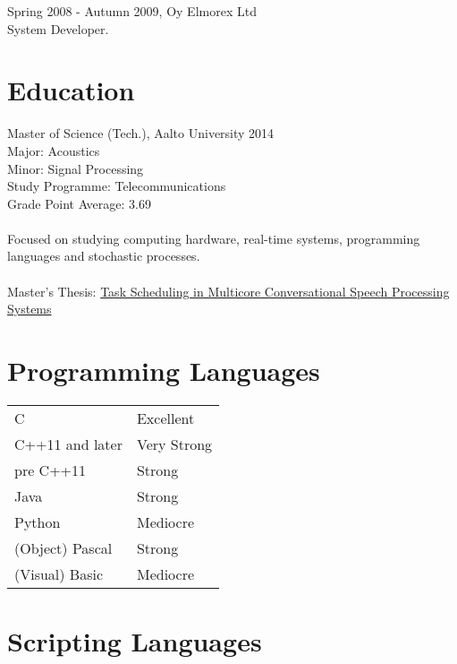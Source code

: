 \documentclass[12pt]{article}
\begin{document}
\large{Spring 2008 - Autumn 2009, Oy Elmorex Ltd}\\
\normalsize{System Developer.}\\


\section*{Education}

\large{Master of Science (Tech.), Aalto University 2014}\\
\normalsize{
Major: Acoustics\\
Minor: Signal Processing\\
Study Programme: Telecommunications\\
Grade Point Average: 3.69\\
\\
Focused on studying computing hardware, real-time systems, programming 
languages and stochastic processes.\\
\\
Master's Thesis:
\href{https://aaltodoc.aalto.fi/bitstream/handle/123456789/14402/master_
Lindroos_Michele_2014.pdf?sequence=1}
{Task Scheduling in Multicore Conversational Speech Processing Systems}
}


\section*{Programming Languages}

\begin{tabular}{ll}
C & Excellent\\
C++11 and later & Very Strong\\
pre C++11 & Strong\\
Java & Strong\\
Python & Mediocre\\
(Object) Pascal & Strong\\
(Visual) Basic & Mediocre
\end{tabular}


\section*{Scripting Languages}
\end{document}
